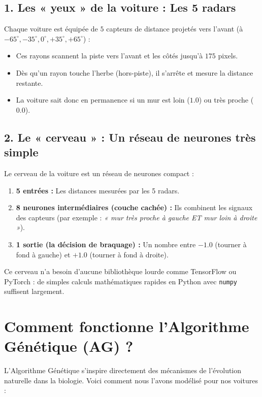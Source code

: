\documentclass[12pt,a4paper]{article}
\begin{document}
\subsection{1. Les « yeux » de la voiture : Les 5 radars}
Chaque voiture est équipée de $5$ capteurs de distance projetés vers l'avant (à $-65^\circ, -35^\circ, 0^\circ, +35^\circ, +65^\circ$) :
\begin{itemize}[leftmargin=*]
  \item Ces rayons scannent la piste vers l'avant et les côtés jusqu'à $175$ pixels.
  \item Dès qu'un rayon touche l'herbe (hors-piste), il s'arrête et mesure la distance restante.
  \item La voiture sait donc en permanence si un mur est loin ($1.0$) ou très proche ($0.0$).
\end{itemize}

\subsection{2. Le « cerveau » : Un réseau de neurones très simple}
Le cerveau de la voiture est un réseau de neurones compact :
\begin{enumerate}
  \item \textbf{5 entrées :} Les distances mesurées par les 5 radars.
  \item \textbf{8 neurones intermédiaires (couche cachée) :} Ils combinent les signaux des capteurs (par exemple : \textit{« mur très proche à gauche ET mur loin à droite »}).
  \item \textbf{1 sortie (la décision de braquage) :} Un nombre entre $-1.0$ (tourner à fond à gauche) et $+1.0$ (tourner à fond à droite).
\end{enumerate}

Ce cerveau n'a besoin d'aucune bibliothèque lourde comme TensorFlow ou PyTorch : de simples calculs mathématiques rapides en Python avec \texttt{numpy} suffisent largement.

\section{Comment fonctionne l'Algorithme Génétique (AG) ?}

L'Algorithme Génétique s'inspire directement des mécanismes de l'évolution naturelle dans la biologie. Voici comment nous l'avons modélisé pour nos voitures :
\end{document}
